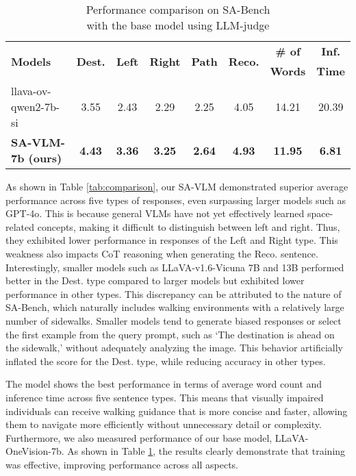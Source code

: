 \setlength{\tabcolsep}{2pt}
\begin{table}[t!]
\caption{Performance comparison on SA-Bench \\with the base model using LLM-judge}
\vspace{-3mm}
\label{tab:with_train_performance}
\centering
\begin{tabular}{|l|c|c|c|c|c|c|c|}
\hline
\multirow{2}{*}{\textbf{Models}} & \multirow{2}{*}{\textbf{Dest.}} & \multirow{2}{*}{\textbf{Left}} & \multirow{2}{*}{\textbf{Right}} & \multirow{2}{*}{\textbf{Path}} & \multirow{2}{*}{\textbf{Reco.}}& \textbf{\# of} & \textbf{Inf.} \\
&&&&&&\textbf{Words}&\textbf{Time}\\
\hline
\hline
llava-ov-qwen2-7b-si \cite{li2024llavaonevisioneasyvisualtask} & 3.55 & 2.43 & 2.29 & 2.25 & 4.05 & 14.21 & 20.39\\ 
\hline
\textbf{SA-VLM-7b (ours)} & \textbf{4.43} & \textbf{3.36} & \textbf{3.25} & \textbf{2.64} & \textbf{4.93} & \textbf{11.95} & \textbf{6.81} \\ 
\hline
\end{tabular}
\vspace{-20pt}
\end{table}

As shown in Table \ref{tab:comparison}, our SA-VLM demonstrated superior average performance across five types of responses, even surpassing larger models such as GPT-4o.
This is because general VLMs have not yet effectively learned space-related concepts, making it difficult to distinguish between left and right. 
Thus, they exhibited lower performance in responses of the Left and Right type.
This weakness also impacts CoT reasoning when generating the Reco. sentence.
Interestingly, smaller models such as LLaVA-v1.6-Vicuna 7B and 13B performed better in the Dest. type compared to larger models but exhibited lower performance in other types. 
This discrepancy can be attributed to the nature of SA-Bench, which naturally includes walking environments with a relatively large number of sidewalks.
Smaller models tend to generate biased responses or select the first example from the query prompt, such as `The destination is ahead on the sidewalk,' without adequately analyzing the image. This behavior artificially inflated the score for the Dest. type, while reducing accuracy in other types.

The model shows the best performance in terms of average word count and inference time across five sentence types.
This means that visually impaired individuals can receive walking guidance that is more concise and faster, allowing them to navigate more efficiently without unnecessary detail or complexity.
Furthermore, we also measured performance of our base model, LLaVA-OneVision-7b.
As shown in Table \ref{tab:with_train_performance}, the results clearly demonstrate that training was effective, improving performance across all aspects.

